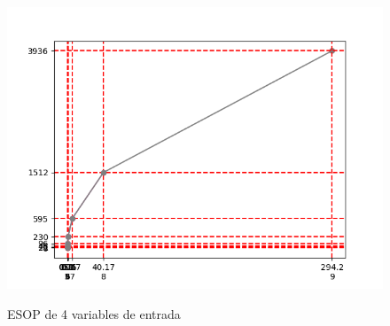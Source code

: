 \begin{figure}[h!]
    \begin{minipage}{0.5\textwidth}
        \centering
        \includegraphics[width=\linewidth]{img/4_variables.png}
        \parbox{\linewidth}{\centering ESOP de 4 variables de entrada}
    \end{minipage}
\end{figure}

